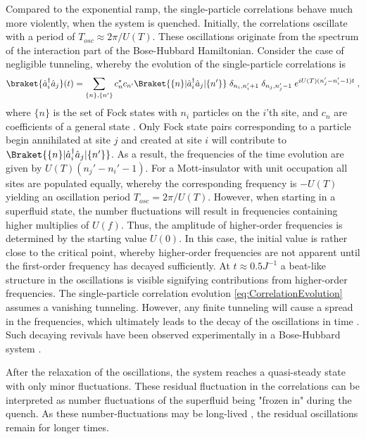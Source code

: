 Compared to the exponential ramp, the single-particle correlations behave much more violently, when the system is quenched. Initially, the correlations oscillate with a period of $T_{osc} \approx 2 \pi / U(T)$. These oscillations originate from the spectrum of the interaction part of the Bose-Hubbard Hamiltonian. Consider the case of negligible tunneling, whereby the evolution of the single-particle correlations is
\begin{equation}
	\braket{\hat{a}_{i}^{\dag} \hat{a}_{j}}(t) = \sum_{ \{ n \} , \{ n' \}} c_{n}^{*} c_{n'} \Braket{ \{ n \} | \hat{a}_{i}^{\dag} \hat{a}_{j} | \{ n' \}} \; \delta_{n_i , n_{i}' +1} \; \delta_{n_j , n_{j}' -1} \; e^{i U(T) (n_j ' - n_i ' - 1) t} \; ,
	\label{eq:CorrelationEvolution}
\end{equation}
where $\{ n \}$ is the set of Fock states with $n_i$ particles on the $i$'th site, and $c_n$ are coefficients of a general state \cite{Lauchli2008}. Only Fock state pairs corresponding to a particle begin annihilated at site $j$ and created at site $i$ will contribute to $\Braket{ \{ n \} | \hat{a}_{i}^{\dag} \hat{a}_{j} | \{ n' \}}$. As a result, the frequencies of the time evolution are given by $U(T) (n_j ' - n_i ' - 1)$. For a Mott-insulator with unit occupation all sites are populated equally, whereby the corresponding frequency is $-U(T)$ yielding an oscillation period $T_{osc} = 2 \pi / U(T)$. However, when starting in a superfluid state, the number fluctuations will result in frequencies containing higher multiplies of $U(f)$. Thus, the amplitude of higher-order frequencies is determined by the starting value $U(0)$.
In this case, the initial value is rather close to the critical point, whereby higher-order frequencies are not apparent until the first-order frequency has decayed sufficiently. At $t \approx 0.5 J^{-1}$ a beat-like structure in the oscillations is visible signifying contributions from higher-order frequencies. 
The single-particle correlation evolution \eqref{eq:CorrelationEvolution} assumes a vanishing tunneling. However, any finite tunneling will cause a spread in the frequencies, which ultimately leads to the decay of the oscillations in time \cite{Kollath2007}. Such decaying revivals have been observed experimentally in a Bose-Hubbard system \cite{Greiner2002collapse}.

After the relaxation of the oscillations, the system reaches a quasi-steady state with only minor fluctuations. These residual fluctuation in the correlations can be interpreted as number fluctuations of the superfluid being "frozen in" during the quench. As these number-fluctuations may be long-lived \cite{Schutzhold2006}, the residual oscillations remain for longer times. 

